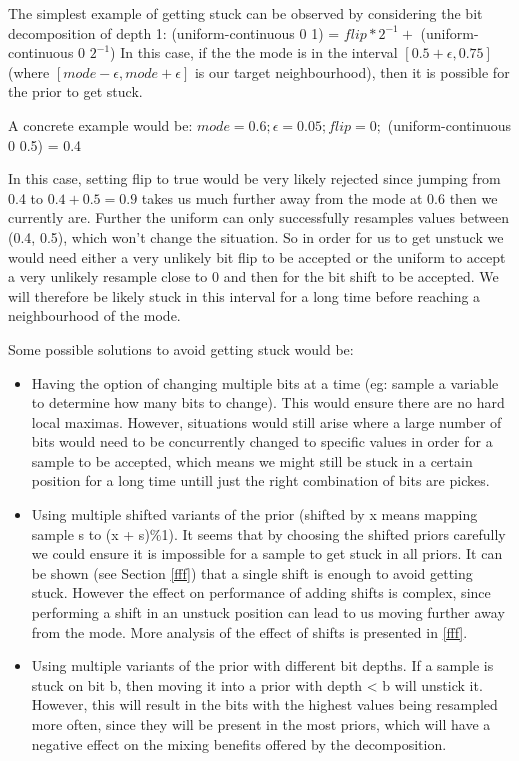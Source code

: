 The simplest example of getting stuck can be observed by considering the bit decomposition of depth 1: 
(uniform-continuous 0 1) = $flip*2^{-1} +$ (uniform-continuous 0 $2^{-1}$) In this case, if the the mode is in the interval $[0.5 + \epsilon , 0.75]$ (where $[mode - \epsilon, mode + \epsilon]$ is our target neighbourhood), then it is possible for the prior to get stuck.
 
A concrete example would be:
$mode = 0.6;
\epsilon = 0.05;
flip = 0;$
(uniform-continuous 0 0.5) = 0.4

In this case, setting flip to true would be very likely rejected since jumping from 0.4 to $0.4 + 0.5 = 0.9$ takes us much further away from the mode at 0.6 then we currently are. Further the uniform can only successfully resamples values between (0.4, 0.5), which won't change the situation. So in order for us to get unstuck we would need either a very unlikely bit flip to be accepted or the uniform to accept a very unlikely resample close to 0 and then for the bit shift to be accepted. We will therefore be likely stuck in this interval for a long time before reaching a neighbourhood of the mode.

Some possible solutions to avoid getting stuck would be:
\begin{itemize}

\item 
Having the option of changing multiple bits at a time (eg: sample a variable to determine how many bits to change). This would ensure there are no hard local maximas. However, situations would still arise where a large number of bits would need to be concurrently changed to specific values in order for a sample to be accepted, which means we might still be stuck in a certain position for a long time untill just the right combination of bits are pickes. 

\item
Using multiple shifted variants of the prior (shifted by x means mapping sample s to (x + s)\%1). It seems that by choosing the shifted priors carefully we could ensure it is impossible for a sample to get stuck in all priors. It can be shown (see Section \ref{fff}) that a single shift is enough to avoid getting stuck. However the effect on performance of adding shifts is complex, since performing a shift in an unstuck position can lead to us moving further away from the mode. More analysis of the effect of shifts is presented in \ref{fff}.

\item
Using multiple variants of the prior with different bit depths. If a sample is stuck on bit b, then moving it into a prior with depth < b will unstick it. However, this will result in the bits with the highest values being resampled more often, since they will be present in the most priors, which will have a negative effect on the mixing benefits offered by the decomposition.

\end{itemize}

